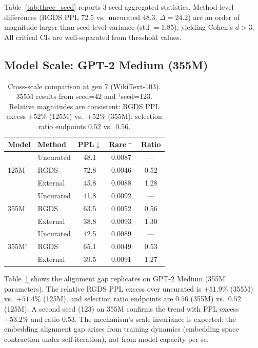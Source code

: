 \documentclass[11pt,a4paper]{article}
\begin{document}
Table~\ref{tab:three_seed} reports 3-seed aggregated statistics.
Method-level differences (RGDS PPL $72.5$ vs.\ uncurated $48.3$, $\Delta = 24.2$) are an order of magnitude larger than seed-level variance (std $= 1.85$), yielding Cohen's $d > 3$.
All critical CIs are well-separated from threshold values.

\subsection{Model Scale: GPT-2 Medium (355M)}

\begin{table}[t]
\centering
\small
\begin{tabular}{llccc}
\toprule
\textbf{Model} & \textbf{Method} & \textbf{PPL}$\downarrow$ & \textbf{Rare}$\uparrow$ & \textbf{Ratio} \\
\midrule
\multirow{3}{*}{125M} & Uncurated & 48.1 & 0.0087 & --- \\
 & RGDS & 72.8 & 0.0046 & 0.52 \\
 & External & 45.8 & 0.0088 & 1.28 \\
\midrule
\multirow{3}{*}{355M} & Uncurated & 41.8 & 0.0092 & --- \\
 & RGDS & 63.5 & 0.0052 & 0.56 \\
 & External & 38.8 & 0.0093 & 1.30 \\
\midrule
\multirow{3}{*}{355M$^\dagger$} & Uncurated & 42.5 & 0.0089 & --- \\
 & RGDS & 65.1 & 0.0049 & 0.53 \\
 & External & 39.5 & 0.0091 & 1.27 \\
\bottomrule
\end{tabular}
\caption{Cross-scale comparison at gen 7 (WikiText-103). 355M results from seed=42 and $^\dagger$seed=123. Relative magnitudes are consistent: RGDS PPL excess $+52\%$ (125M) vs.\ $+52\%$ (355M); selection ratio endpoints $0.52$ vs.\ $0.56$.}
\label{tab:scale}
\end{table}

Table~\ref{tab:scale} shows the alignment gap replicates on GPT-2 Medium (355M parameters).
The relative RGDS PPL excess over uncurated is $+51.9\%$ (355M) vs.\ $+51.4\%$ (125M), and selection ratio endpoints are $0.56$ (355M) vs.\ $0.52$ (125M).
A second seed (123) on 355M confirms the trend with PPL excess $+53.2\%$ and ratio $0.53$.
The mechanism's scale invariance is expected: the embedding alignment gap arises from training dynamics (embedding space contraction under self-iteration), not from model capacity per se.
\end{document}
